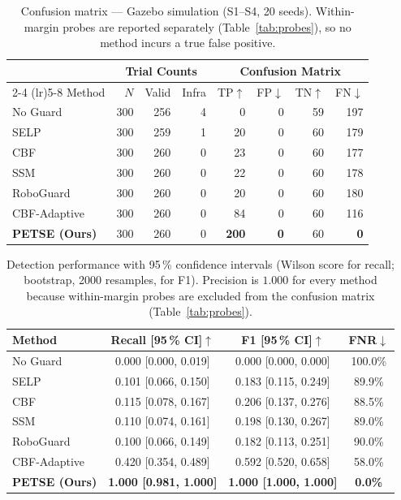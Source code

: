 \documentclass[conference]{IEEEtran}
\newcommand{\tblstyle}{\small\setlength{\tabcolsep}{4pt}}
\begin{document}
\begin{table}[t]
\centering
\tblstyle
\caption{Confusion matrix --- Gazebo simulation (S1--S4, 20 seeds). Within-margin probes are reported separately (Table~\ref{tab:probes}), so no method incurs a true false positive.}
\label{tab:confusion}
\footnotesize
\begin{tabular}{@{}l rrr rrrr@{}}
\toprule
& \multicolumn{3}{c}{Trial Counts} & \multicolumn{4}{c}{Confusion Matrix} \\
\cmidrule(lr){2-4} \cmidrule(lr){5-8}
Method & $N$ & Valid & Infra & TP$\uparrow$ & FP$\downarrow$ & TN$\uparrow$ & FN$\downarrow$ \\
\midrule
No Guard & 300 & 256 & 4 & 0 & 0 & 59 & 197 \\
SELP & 300 & 259 & 1 & 20 & 0 & 60 & 179 \\
CBF & 300 & 260 & 0 & 23 & 0 & 60 & 177 \\
SSM & 300 & 260 & 0 & 22 & 0 & 60 & 178 \\
RoboGuard & 300 & 260 & 0 & 20 & 0 & 60 & 180 \\
CBF-Adaptive & 300 & 260 & 0 & 84 & 0 & 60 & 116 \\
\rowcolor{lightgray} \textbf{PETSE (Ours)} & 300 & 260 & 0 & \textbf{200} & \textbf{0} & 60 & \textbf{0} \\
\bottomrule
\end{tabular}
\end{table}

\begin{table}[t]
\centering
\tblstyle
\caption{Detection performance with 95\,\% confidence intervals (Wilson score for recall; bootstrap, 2000 resamples, for F1). Precision is $1.000$ for every method because within-margin probes are excluded from the confusion matrix (Table~\ref{tab:probes}).}
\label{tab:detection}
\footnotesize
\begin{tabular}{@{}l c c c@{}}
\toprule
Method & Recall [95\,\% CI]$\uparrow$ & F1 [95\,\% CI]$\uparrow$ & FNR$\downarrow$ \\
\midrule
No Guard & 0.000 [0.000, 0.019] & 0.000 [0.000, 0.000] & 100.0\% \\
SELP & 0.101 [0.066, 0.150] & 0.183 [0.115, 0.249] & 89.9\% \\
CBF & 0.115 [0.078, 0.167] & 0.206 [0.137, 0.276] & 88.5\% \\
SSM & 0.110 [0.074, 0.161] & 0.198 [0.130, 0.267] & 89.0\% \\
RoboGuard & 0.100 [0.066, 0.149] & 0.182 [0.113, 0.251] & 90.0\% \\
CBF-Adaptive & 0.420 [0.354, 0.489] & 0.592 [0.520, 0.658] & 58.0\% \\
\rowcolor{lightgray} \textbf{PETSE (Ours)} & \textbf{1.000 [0.981, 1.000]} & \textbf{1.000 [1.000, 1.000]} & \textbf{0.0\%} \\
\bottomrule
\end{tabular}
\end{table}
\end{document}
